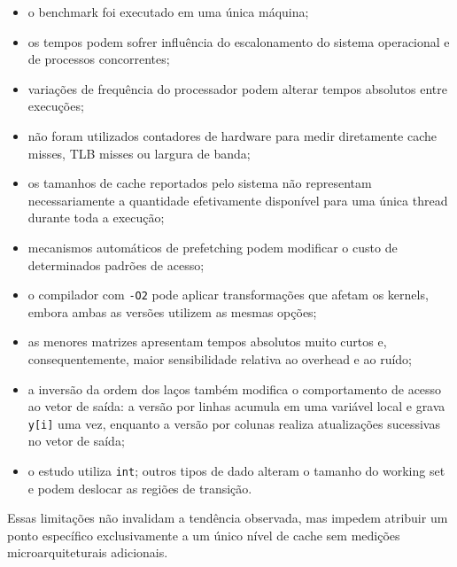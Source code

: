 \begin{itemize}

    \item o benchmark foi executado em uma única máquina;

    \item os tempos podem sofrer influência do escalonamento do sistema
    operacional e de processos concorrentes;

    \item variações de frequência do processador podem alterar tempos
    absolutos entre execuções;

    \item não foram utilizados contadores de hardware para medir
    diretamente cache misses, TLB misses ou largura de banda;

    \item os tamanhos de cache reportados pelo sistema não representam
    necessariamente a quantidade efetivamente disponível para uma única
    thread durante toda a execução;

    \item mecanismos automáticos de prefetching podem modificar o custo
    de determinados padrões de acesso;

    \item o compilador com \texttt{-O2} pode aplicar transformações que
    afetam os kernels, embora ambas as versões utilizem as mesmas opções;

    \item as menores matrizes apresentam tempos absolutos muito curtos e,
    consequentemente, maior sensibilidade relativa ao overhead e ao ruído;

    \item a inversão da ordem dos laços também modifica o comportamento
    de acesso ao vetor de saída: a versão por linhas acumula em uma
    variável local e grava \texttt{y[i]} uma vez, enquanto a versão por
    colunas realiza atualizações sucessivas no vetor de saída;

    \item o estudo utiliza \texttt{int}; outros tipos de dado alteram o
    tamanho do working set e podem deslocar as regiões de transição.

\end{itemize}

Essas limitações não invalidam a tendência observada, mas impedem atribuir
um ponto específico exclusivamente a um único nível de cache sem medições
microarquiteturais adicionais.


